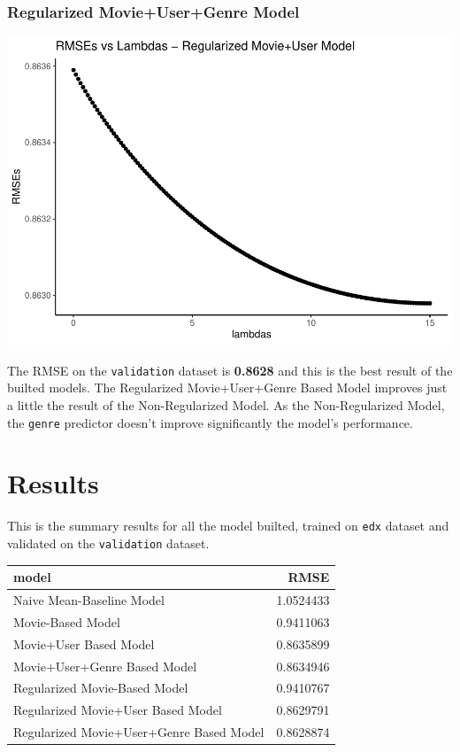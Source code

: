 \documentclass[
]{article}
\begin{document}
\hypertarget{regularized-movieusergenre-model}{%
\subsubsection{Regularized Movie+User+Genre
Model}\label{regularized-movieusergenre-model}}

\begin{center}\includegraphics{MovieLens-Project-Report_files/figure-latex/unnamed-chunk-38-1} \end{center}

The RMSE on the \texttt{validation} dataset is \textbf{0.8628} and this
is the best result of the builted models. The Regularized
Movie+User+Genre Based Model improves just a little the result of the
Non-Regularized Model. As the Non-Regularized Model, the \texttt{genre}
predictor doesn't improve significantly the model's performance.

\hypertarget{results}{%
\section{Results}\label{results}}

This is the summary results for all the model builted, trained on
\texttt{edx} dataset and validated on the \texttt{validation} dataset.

\begin{table}
\centering\begingroup\fontsize{10}{12}\selectfont

\begin{tabular}{l|r}
\hline
model & RMSE\\
\hline
Naive Mean-Baseline Model & 1.0524433\\
\hline
Movie-Based Model & 0.9411063\\
\hline
Movie+User Based Model & 0.8635899\\
\hline
Movie+User+Genre Based Model & 0.8634946\\
\hline
Regularized Movie-Based Model & 0.9410767\\
\hline
Regularized Movie+User Based Model & 0.8629791\\
\hline
Regularized Movie+User+Genre Based Model & 0.8628874\\
\hline
\end{tabular}
\endgroup{}
\end{table}
\end{document}
